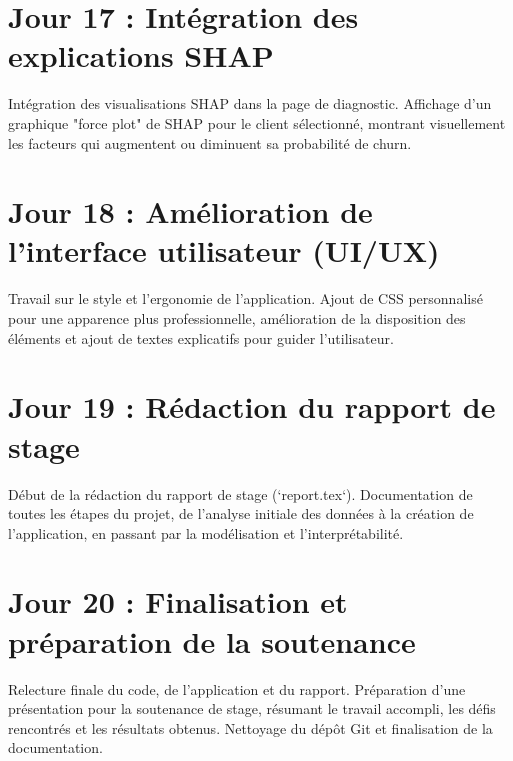 \documentclass[11pt, a4paper]{report}
\begin{document}
\section{Jour 17 : Intégration des explications SHAP}
Intégration des visualisations SHAP dans la page de diagnostic. Affichage d'un graphique "force plot" de SHAP pour le client sélectionné, montrant visuellement les facteurs qui augmentent ou diminuent sa probabilité de churn.

\section{Jour 18 : Amélioration de l'interface utilisateur (UI/UX)}
Travail sur le style et l'ergonomie de l'application. Ajout de CSS personnalisé pour une apparence plus professionnelle, amélioration de la disposition des éléments et ajout de textes explicatifs pour guider l'utilisateur.

\section{Jour 19 : Rédaction du rapport de stage}
Début de la rédaction du rapport de stage (`report.tex`). Documentation de toutes les étapes du projet, de l'analyse initiale des données à la création de l'application, en passant par la modélisation et l'interprétabilité.

\section{Jour 20 : Finalisation et préparation de la soutenance}
Relecture finale du code, de l'application et du rapport. Préparation d'une présentation pour la soutenance de stage, résumant le travail accompli, les défis rencontrés et les résultats obtenus. Nettoyage du dépôt Git et finalisation de la documentation.
\end{document}
